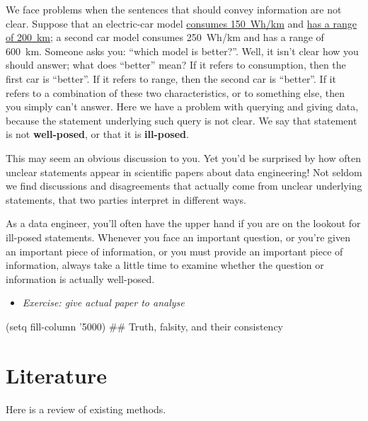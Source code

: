 \documentclass[]{book}
\providecommand{\tightlist}{%
  \setlength{\itemsep}{0pt}\setlength{\parskip}{0pt}}
\begin{document}
We face problems when the sentences that should convey information are not clear. Suppose that an electric-car model \href{https://ev-database.org/cheatsheet/energy-consumption-electric-car}{consumes 150~Wh/km} and \href{https://ev-database.org/cheatsheet/range-electric-car}{has a range of 200~km}; a second car model consumes 250~Wh/km and has a range of 600~km. Someone asks you: ``which model is better?''. Well, it isn't clear how you should answer; what does ``better'' mean? If it refers to consumption, then the first car is ``better''. If it refers to range, then the second car is ``better''. If it refers to a combination of these two characteristics, or to something else, then you simply can't answer. Here we have a problem with querying and giving data, because the statement underlying such query is not clear. We say that statement is not \textbf{well-posed}, or that it is \textbf{ill-posed}.

This may seem an obvious discussion to you. Yet you'd be surprised by how often unclear statements appear in scientific papers about data engineering! Not seldom we find discussions and disagreements that actually come from unclear underlying statements, that two parties interpret in different ways.

As a data engineer, you'll often have the upper hand if you are on the lookout for ill-posed statements. Whenever you face an important question, or you're given an important piece of information, or you must provide an important piece of information, always take a little time to examine whether the question or information is actually well-posed.

\begin{itemize}
\tightlist
\item
  \emph{Exercise: give actual paper to analyse}
\end{itemize}

(setq fill-column '5000)
\#\# Truth, falsity, and their consistency

\hypertarget{literature}{%
\chapter{Literature}\label{literature}}

Here is a review of existing methods.


\end{document}
